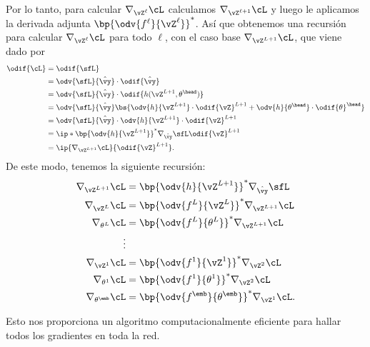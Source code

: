 \documentclass[../../book-main_es.tex]{subfiles}
\begin{document}
Por lo tanto, para calcular \(\nabla_{\vZ^{\ell}}\cL\) calculamos
\(\nabla_{\vZ^{\ell + 1}}\cL\) y luego le aplicamos la derivada adjunta
\(\bp{\odv{f^{\ell}}{\vZ^{\ell}}}^{*}\). Así que obtenemos una recursión
para calcular \(\nabla_{\vZ^{\ell}}\cL\) para todo \(\ell\), con el caso base
\(\nabla_{\vZ^{L + 1}}\cL\), que viene dado por
\begin{align}
    \odif{\cL}
    &= \odif{\sfL} \\
    &= \odv{\sfL}{\hat{\vy}}\cdot\odif{\hat{\vy}} \\
    &= \odv{\sfL}{\hat{\vy}}\cdot\odif{{h(\vZ^{L + 1}, \theta^{\head})}} \\
    &= \odv{\sfL}{\hat{\vy}}\bs{\odv{h}{\vZ^{L +
        1}}\cdot\odif{\vZ}^{L + 1} +
    \odv{h}{\theta^{\head}}\cdot\odif{\theta}^{\head}} \\
    &= \odv{\sfL}{\hat{\vy}}\cdot \odv{h}{\vZ^{L + 1}}\cdot\odif{\vZ}^{L + 1} \\
    &= \ip*{\bp{\odv{h}{\vZ^{L +
    1}}}^{*}\nabla_{\hat{\vy}}\sfL}{\odif{\vZ}^{L + 1}} \\
    &= \ip{\nabla_{\vZ^{L + 1}}\cL}{\odif{\vZ}^{L + 1}}.
\end{align}
De este modo, tenemos la siguiente recursión:
\begin{align}
    \nabla_{\vZ^{L + 1}}\cL
    &= \bp{\odv{h}{\vZ^{L + 1}}}^{*}\nabla_{\hat{\vy}}\sfL \\
    \nabla_{\vZ^{L}}\cL
    &= \bp{\odv{f^{L}}{\vZ^{L}}}^{*}\nabla_{\vZ^{L + 1}}\cL \\
    \nabla_{\theta^{L}}\cL
    &= \bp{\odv{f^{L}}{\theta^{L}}}^{*}\nabla_{\vZ^{L + 1}}\cL \\
    \vdots &  \\
    \nabla_{\vZ^{1}}\cL
    &= \bp{\odv{f^{1}}{\vZ^{1}}}^{*}\nabla_{\vZ^{2}}\cL \\
    \nabla_{\theta^{1}}\cL
    &= \bp{\odv{f^{1}}{\theta^{1}}}^{*}\nabla_{\vZ^{2}}\cL \\
    \nabla_{\theta^{\emb}}\cL
    &= \bp{\odv{f^{\emb}}{\theta^{\emb}}}^{*}\nabla_{\vZ^{1}}\cL.
\end{align}

Esto nos proporciona un algoritmo computacionalmente eficiente para hallar todos los
gradientes en toda la red.
\end{document}
